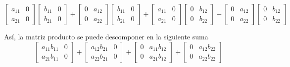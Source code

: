 \documentclass[a4paper,10pt]{article}
\begin{document}
$$
	\left[
	\begin{array}{cc}
		a_{11} & 0 \\
		a_{21} & 0
	\end{array}
	\right]
	\left[
	\begin{array}{cc}
		b_{11} & 0 \\
		b_{21} & 0
	\end{array}
	\right]
        +
	\left[
	\begin{array}{cc}
		0 & a_{12} \\
		0 & a_{22}
	\end{array}
	\right]
	\left[
	\begin{array}{cc}
		b_{11} & 0 \\
		b_{21} & 0
	\end{array}
	\right]
	+
	\left[
	\begin{array}{cc}
		a_{11} & 0 \\
		a_{21} & 0
	\end{array}
	\right]
	\left[
	\begin{array}{cc}
		0 & b_{12} \\
		0 & b_{22}
	\end{array}
	\right]
        +
	\left[
	\begin{array}{cc}
		0 & a_{12} \\
		0 & a_{22}
	\end{array}
	\right]
	\left[
	\begin{array}{cc}
		0 & b_{12} \\
		0 & b_{22}
	\end{array}
	\right]
$$

Así, la matriz producto se puede descomponer en la siguiente suma
$$
	\left[
	\begin{array}{cc}
		a_{11} b_{11} & 0 \\
		a_{21} b_{11} & 0
	\end{array}
	\right]
        +
	\left[
	\begin{array}{cc}
		a_{12} b_{21} & 0 \\
		a_{22} b_{21} & 0
	\end{array}
	\right]
	+
	\left[
	\begin{array}{cc}
		0 & a_{11} b_{12} \\
		0 & a_{21} b_{12}
	\end{array}
	\right]
        +
	\left[
	\begin{array}{cc}
		0 & a_{12} b_{22} \\
		0 & a_{22} b_{22}
	\end{array}
	\right]
$$
\end{document}
